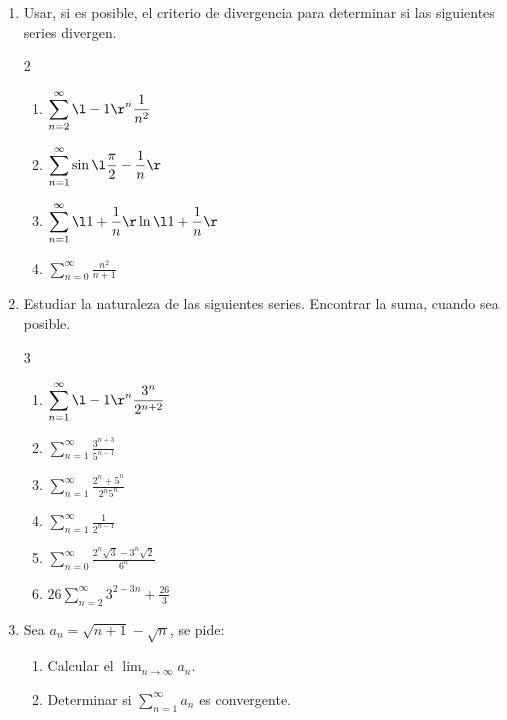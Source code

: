 \renewcommand{\theenumi}{\arabic{enumi}}
\renewcommand{\labelenumi}{\textbf{\theenumi.-}}
\begin{enumerate}
\item Usar, si es posible, el criterio de divergencia para determinar si las siguientes series divergen.
\begin{multicols}{2}
\begin{enumerate}
\item $ \displaystyle{ \sum_{n=2}^{\infty}{ \l -1 \r^n \frac{1}{n^2} } } $
\item $ \displaystyle{ \sum_{n=1}^{\infty}{ \sin{ \l \frac{\pi}{2} - \frac{1}{n} \r} } } $
\item $ \displaystyle{ \sum_{n=1}^{\infty}{ \l 1 + \frac{1}{n} \r \ln{\l 1 + \frac{1}{n} \r }} } $
\item $ \displaystyle{ \sum_{n=0}^{\infty}{ \frac{n^2}{n + 1} } } $
\end{enumerate}
\end{multicols}

\item Estudiar la naturaleza de las siguientes series. Encontrar la suma, cuando sea posible.
\begin{multicols}{3}
\begin{enumerate}
\item $ \displaystyle{ \sum_{n=1}^{\infty}{ \l -1 \r^n \frac{3^n}{2^{n+2}} } } $
\item $ \displaystyle{ \sum_{n=1}^{\infty}{ \frac{3^{n+3}}{5^{n-1}} } } $
\item $ \displaystyle{ \sum_{n=1}^{\infty}{ \frac{2^n + 5^n}{2^n 5^n}} } $
\item $ \displaystyle{ \sum_{n=1}^{\infty}{ \frac{1}{2^{n-1}} } } $
\item $ \displaystyle{ \sum_{n=0}^{\infty}{ \frac{2^n \sqrt{3} - 3^n \sqrt{2}}{6^n} } } $
\item $ \displaystyle{26 \sum_{n=2}^{\infty}{ 3^{2-3n } } + \frac{26}{3} } $
\end{enumerate}
\end{multicols}

\item Sea $\displaystyle{a_n = \sqrt{n+1} - \sqrt{n} }$, se pide:
\begin{enumerate}
\item Calcular el $\displaystyle{ \lim_{n \rightarrow \infty}{a_n} }$.
\item Determinar si $\displaystyle{\sum_{n=1}^{\infty}{a_n}}$ es convergente.
\end{enumerate}


\end{enumerate}
